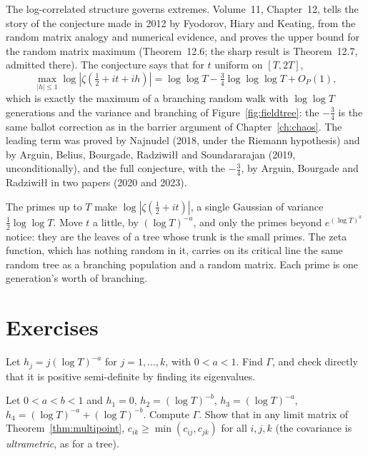 \begin{remark}\label{rem:fhk}
The log-correlated structure governs extremes. Volume~11, Chapter~12, tells the story of the conjecture made in 2012 by Fyodorov, Hiary and Keating, from the random matrix analogy and numerical evidence, and proves the upper bound for the random matrix maximum (Theorem~12.6; the sharp result is Theorem~12.7, admitted there). The conjecture says that for $t$ uniform on $[T,2T]$,
\[
\max_{|h|\le1}\log|\zeta(\tfrac12+it+ih)|=\log\log T-\tfrac34\log\log\log T+O_P(1),
\]
which is exactly the maximum of a branching random walk with $\log\log T$ generations and the variance and branching of Figure~\ref{fig:fieldtree}: the $-\frac34$ is the same ballot correction as in the barrier argument of Chapter~\ref{ch:chaos}. The leading term was proved by Najnudel (2018, under the Riemann hypothesis) and by Arguin, Belius, Bourgade, Radziwi\l\l{} and Soundararajan (2019, unconditionally), and the full conjecture, with the $-\frac34$, by Arguin, Bourgade and Radziwi\l\l{} in two papers (2020 and 2023).
\end{remark}

\begin{beauty}
The primes up to $T$ make $\log|\zeta(\frac12+it)|$, a single Gaussian of variance $\frac12\log\log T$. Move $t$ a little, by $(\log T)^{-a}$, and only the primes beyond $e^{(\log T)^a}$ notice: they are the leaves of a tree whose trunk is the small primes. The zeta function, which has nothing random in it, carries on its critical line the same random tree as a branching population and a random matrix. Each prime is one generation's worth of branching.
\end{beauty}

\section{Exercises}

\begin{exercise}[$\star$]\label{ex:equicorr}
Let $h_j=j(\log T)^{-a}$ for $j=1,\dots,k$, with $0<a<1$. Find $\Gamma$, and check directly that it is positive semi-definite by finding its eigenvalues.
\end{exercise}

\begin{exercise}[$\star\star$]\label{ex:ultrametric}
Let $0<a<b<1$ and $h_1=0$, $h_2=(\log T)^{-b}$, $h_3=(\log T)^{-a}$, $h_4=(\log T)^{-a}+(\log T)^{-b}$. Compute $\Gamma$. Show that in any limit matrix of Theorem~\ref{thm:multipoint}, $c_{ik}\ge\min(c_{ij},c_{jk})$ for all $i,j,k$ (the covariance is \emph{ultrametric}, as for a tree).
\end{exercise}

